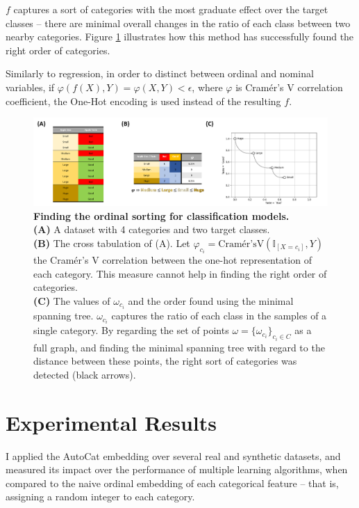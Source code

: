 \documentclass{article}
\begin{document}
$f$ captures a sort of categories with the most graduate effect over the target classes -- there are minimal overall changes in the ratio of each class between two nearby categories. Figure \ref{figure:fig2} illustrates how this method has successfully found the right order of categories.

Similarly to regression, in order to distinct between ordinal and nominal variables, if $\varphi(f(X), Y) = \varphi(X, Y) < \epsilon$, where $\varphi$ is Cramér's V correlation coefficient, the One-Hot encoding is used instead of the resulting $f$.

\begin{figure}
\includegraphics[width=\textwidth]{imgs/figure2}

\caption{\label{figure:fig2}
\textbf{Finding the ordinal sorting for classification models.} \\
\textbf{(A)} A dataset with 4 categories and two target classes. \\
\textbf{(B)} The cross tabulation of (A). Let $\varphi_{c_i} = \text{Cramér'sV}(\mathbb{I}_{[X = c_i]}, Y)$ the Cramér's V correlation between the one-hot representation of each category. This measure cannot help in finding the right order of categories. \\
\textbf{(C)} The values of $\omega_{c_i}$ and the order found using the minimal spanning tree. $\omega_{c_i}$ captures the ratio of each class in the samples of a single category. By regarding the set of points $\omega = \{\omega_{c_i}\}_{c_i \in C}$ as a full graph, and finding the minimal spanning tree with regard to the distance between these points, the right sort of categories was detected (black arrows).
}
\end{figure}

\section{Experimental Results}
\label{section:results}

I applied the AutoCat embedding over several real and synthetic datasets, and measured its impact over the performance of multiple learning algorithms, when compared to the naive ordinal embedding of each categorical feature -- that is, assigning a random integer to each category.
\end{document}

